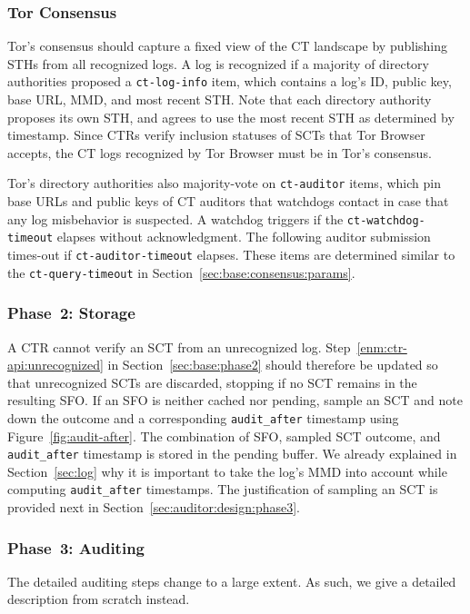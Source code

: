 \subsubsection{Tor Consensus} \label{sec:auditor:design:consensus}
Tor's consensus should capture a fixed view of the CT landscape by publishing
STHs from all recognized logs.  A log is recognized if a majority of directory
authorities proposed a \texttt{ct-log-info} item, which contains a log's ID,
public key, base URL, MMD, and most recent STH.  Note that each directory
authority proposes its own STH, and agrees to use the most recent STH as
determined by timestamp.  Since CTRs verify inclusion statuses of SCTs
that Tor Browser accepts, the CT logs recognized by Tor Browser must be in
Tor's consensus.

Tor's directory authorities also majority-vote on \texttt{ct-auditor} items,
which pin base URLs and public keys of CT auditors that watchdogs contact in
case that any log misbehavior is suspected.  A watchdog triggers if the
\texttt{ct-watchdog-timeout} elapses without acknowledgment.  The following
auditor submission times-out if \texttt{ct-auditor-timeout} elapses.  These
items are determined similar to the \texttt{ct-query-timeout} in
Section~\ref{sec:base:consensus:params}.

\subsubsection{Phase~2: Storage} \label{sec:auditor:design:phase2}
A CTR cannot verify an SCT from an unrecognized log.
Step~\ref{enm:ctr-api:unrecognized} in Section~\ref{sec:base:phase2} should
therefore be updated so that unrecognized SCTs are discarded, stopping if no
SCT remains in the resulting SFO.  If an SFO is neither cached nor pending,
sample an SCT and note down the outcome and a corresponding
\texttt{audit\_after} timestamp using Figure~\ref{fig:audit-after}.  The
combination of SFO, sampled SCT outcome, and \texttt{audit\_after} timestamp is
stored in the pending buffer.  We already explained in Section~\ref{sec:log}
why it is important to take the log's MMD into account while computing
\texttt{audit\_after} timestamps.  The justification of sampling an SCT is
provided next in Section~\ref{sec:auditor:design:phase3}.

\subsubsection{Phase~3: Auditing} \label{sec:auditor:design:auditing}
The detailed auditing steps change to a large extent.  As such, we give a
detailed description from scratch instead.

